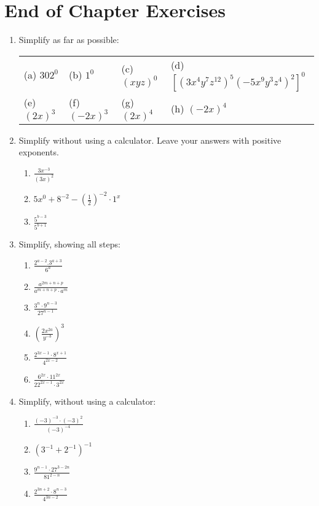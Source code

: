 \documentclass[10pt,a4paper,titlepage,twoside,openright]{report}
\begin{document}
\section{End of Chapter Exercises}
\begin{enumerate}
 \item{Simplify as far as possible:
  \begin{center}
   \begin{tabular}{p{2cm}p{2cm}p{2cm}p{8cm}}
    (a) $302^0$ & (b) $1^0$ & (c) $(xyz)^0$ & (d) $[(3x^4y^7z^{12})^5 (-5x^9y^3z^4)^2]^0$\\
    (e) $(2x)^3$ & (f) $(-2x)^3$ & (g) $(2x)^4$ & (h) $(-2x)^4$\\
   \end{tabular}
  \end{center}
 }
 \item{{Simplify without using a calculator. Leave your answers with positive exponents.}
  \begin{enumerate}
   \item $\frac{3x^{-3}}{(3x)^2}$\\
   \item $5x^0+8^{-2}-{(\frac{1}{2})^{-2}}\cdot 1^x$\\
   \item $\frac{5^{b-3}}{5^{b+1}}$\\
  \end{enumerate}
 }
 \item{Simplify, showing all steps:
  \begin{enumerate}
   \item $\frac{2^{a-2}.3^{a+3}}{6^a}$\\
   \item $\frac{a^{2m+n+p}}{a^{m+n+p} \cdot a^m}$\\
   \item $\frac{3^n \cdot 9^{n-3}}{27^{n-1}}$\\
   \item $(\frac{2x^{2a}}{y^{-b}})^{3}$\\
   \item $\frac{2^{3x-1} \cdot 8^{x+1}}{4^{2x-2}}$\\
   \item $\frac{6^{2x} \cdot 11^{2x}}{22^{2x-1} \cdot 3^{2x}}$\\
  \end{enumerate}
 }
 \item{Simplify, without using a calculator:
  \begin{enumerate}
   \item $\frac{(-3)^{-3} \cdot (-3)^2}{(-3)^{-4}}$\\
   \item ${(3^{-1} + 2^{-1})^{-1}}$\\
   \item $\frac{9^{n-1} \cdot 27^{3-2n}}{81^{2-n}}$\\
   \item $\frac{2^{3n+2} \cdot 8^{n-3}}{4^{3n-2}}$\\
  \end{enumerate}
 }
\end{enumerate}
\end{document}
